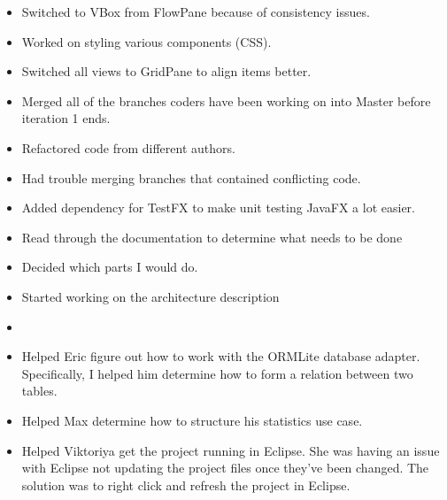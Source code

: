 \documentclass{article}
\begin{document}
	\begin{itemize}
    \item Switched to VBox from FlowPane because of consistency issues.
    \item Worked on styling various components (CSS).
	\end{itemize}
	\begin{itemize}
    \item Switched all views to GridPane to align items better.
	\end{itemize}
	\begin{itemize}
    \item Merged all of the branches coders have been working on into Master before iteration 1 ends.
    \item Refactored code from different authors.
    \item Had trouble merging branches that contained conflicting code.
    \item Added dependency for TestFX to make unit testing JavaFX a lot easier.
  \end{itemize}
  \begin{itemize}
    \item Read through the documentation to determine what needs to be done
    \item Decided which parts I would do.
  \end{itemize}
  \begin{itemize}
    \item Started working on the architecture description
    \item 
  \end{itemize}
  \begin{itemize}
    \item Helped Eric figure out how to work with the ORMLite database adapter. Specifically, I helped him determine
    how to form a relation between two tables.
  \end{itemize}
  \begin{itemize}
    \item Helped Max determine how to structure his statistics use case.
    \item Helped Viktoriya get the project running in Eclipse. She was having an issue with Eclipse not updating the
    project files once they've been changed. The solution was to right click and refresh the project in Eclipse.
  \end{itemize}
\end{document}
